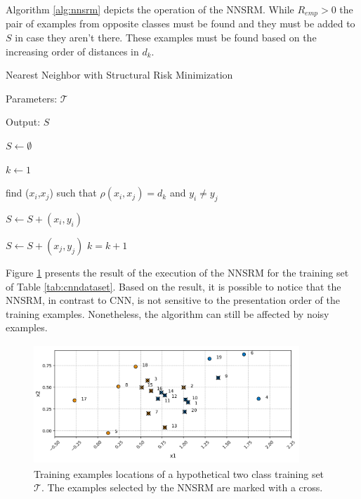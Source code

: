 Algorithm \ref{alg:nnsrm} depicts the operation of the NNSRM. While $R_{emp} > 0$ the pair of examples from opposite classes must be found and they must be added to $S$ in case they aren't there. These examples must be found based on the increasing order of distances in $d_k$.

\vspace{0.2cm}

\begin{algorithm}[H]
    \caption{Nearest Neighbor with Structural Risk Minimization}
	\label{alg:nnsrm}
        
    Parameters: $\mathcal{T}$
    
    Output: $S$
    
    
    \begin{algorithmic}[1] 
    \STATE $S \gets \emptyset$
   
    \STATE $k \gets 1$ 
   
   
   
    \STATE find ($x_i$,$x_j$) such that $\rho(x_i,x_j) = d_k$ and $y_i \neq y_j$     
    
            \STATE $S \gets S + (x_i, y_i)$
    \ENDIF
    
          \STATE $S \gets S + (x_j, y_j)$
    \ENDIF
    \STATE $k = k + 1$     
    
    \ENDWHILE 
    \end{algorithmic}
    
    
\end{algorithm}

\vspace{0.2cm}

Figure \ref{fig:nnsrmdataset} presents the result of the execution of the NNSRM for the training set of Table \ref{tab:cnndataset}. Based on the result, it is possible to notice that the NNSRM, in contrast to CNN, is not sensitive to the presentation order of the training examples. Nonetheless, the algorithm can still be affected by noisy examples. 

\begin{figure}[ht!]
    \centering
    \includegraphics[height = 4.5cm, width =  10cm]{"Part 3 - Learning Systems/Supervised Learning/k-Nearest Neighbors/figures/nnsrmdataset.png"}
    \caption{Training examples locations of a hypothetical two class training set $\mathcal{T}$. The examples selected by the NNSRM are marked with a cross.}
    \label{fig:nnsrmdataset}
\end{figure}

